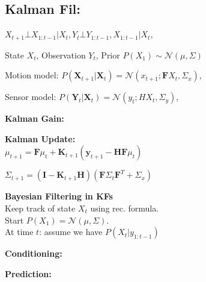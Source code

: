 \subsection*{Kalman Fil:} $X_{t+1} \bot X_{1:t-1} | X_t, Y_t \bot Y_{1:t-1}, X_{1:t-1} | X_t$,

State $X_t$, Observation $Y_t$, Prior $P(X_1)  \sim \mathcal{N}(\mu, \Sigma)$

Motion model: $P(\mathbf{X}_{t+1} | \mathbf{X}_t) = \mathcal{N}(x_{t+1}; \mathbf{F} X_t, \Sigma_x)$, 

Sensor model: \hfill $P(\mathbf{Y}_t | \mathbf{X}_t) = \mathcal{N}(y_t; H X_t, \Sigma_y)$, 

\textbf{Kalman Gain:} \;
\\ 

\textbf{Kalman Update:} \\
$\mu_{t+1} = \mathbf{F} \mu_t + \mathbf{K}_{t+1} (\mathbf{y}_{t+1} - \mathbf{H} \mathbf{F} \mu_t)$

$\Sigma_{t+1} = (\mathbf{I} - \mathbf{K}_{t+1} \mathbf{H}) (\mathbf{F} \Sigma_t \mathbf{F}^T + \Sigma_x)$

\textbf{Bayesian Filtering in KFs} \\
Keep track of state $X_t$ using rec. formula. \\
Start $P(X_1) = \mathcal{N}(\mu, \Sigma)$. \\
At time $t$: assume we have $P(X_t | y_{1:t-1})$

\textbf{Conditioning:} \; 

\textbf{Prediction:} \;

\vspace*{-0.5mm}